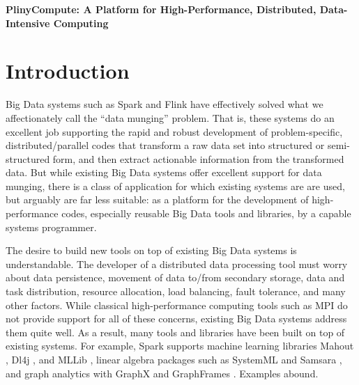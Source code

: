 
\begin{center}\textbf{PlinyCompute: A Platform for High-Performance, Distributed, Data-Intensive Computing}
\end{center}


\section{Introduction}

Big Data systems such as Spark \cite{zaharia2010spark} and Flink \cite{alexandrov2014stratosphere, carbone2015apache}
have effectively solved what we affectionately call the ``data munging'' problem.  That is, 
these systems do an excellent job supporting the rapid
and robust development of problem-specific,
distributed/parallel codes that transform a raw data set into structured 
or semi-structured form, and then
extract actionable information from the transformed data.
But while existing Big Data systems offer
excellent support for data munging,
there is a class of application for which 
existing systems are 
are
used, but arguably are far less suitable:
as a platform 
for the development of high-performance codes, especially reusable
Big Data tools and libraries, by a capable
systems programmer.

The desire to build new tools
on top of existing Big Data systems is understandable.  
The  developer of a distributed data processing tool must worry about data persistence, movement of
data to/from secondary storage, data
and task distribution, resource allocation, load balancing, fault tolerance, and many other factors.
While classical high-performance computing
tools such as MPI \cite{gropp1996high} do not provide support for all of these concerns,
existing Big Data systems 
address them quite well.
As a result, many tools and libraries have been built on top of existing systems.  For example,
Spark supports
machine learning libraries Mahout \cite{mahout}, Dl4j \cite{dj4j}, 
and MLLib \cite{meng2016mllib}, linear algebra packages such as SystemML \cite{tian2012scalable, boehm2016systemml, ghoting2011systemml, boehm2014hybrid} and Samsara \cite{samsara}, and graph analytics with
GraphX \cite{gonzalez2014graphx} and GraphFrames \cite{dave2016graphframes}.  Examples abound.

